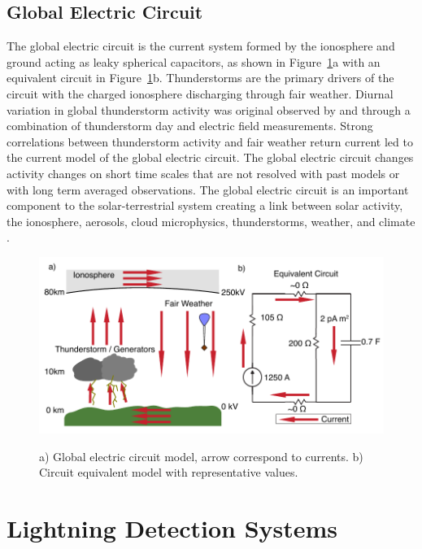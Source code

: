 \subsection{Global Electric Circuit}

The global electric circuit is the current system formed by the ionosphere and ground acting as leaky spherical capacitors, as shown in Figure~\ref{intro:fig:gec}a with an equivalent circuit in Figure~\ref{intro:fig:gec}b.
Thunderstorms are the primary drivers of the circuit with the charged ionosphere discharging through fair weather.
Diurnal variation in global thunderstorm activity was original observed by \citet{Wilson1921} and \citet{Whipple1929} through a combination of thunderstorm day and electric field measurements.
Strong correlations between thunderstorm activity and fair weather return current led to the current model of the global electric circuit.
The global electric circuit changes activity changes on short time scales that are not resolved with past models or with long term averaged observations.
The global electric circuit is an important component to the solar-terrestrial system creating a link between solar activity, the ionosphere, aerosols, cloud microphysics, thunderstorms, weather, and climate \citep{Tinsley2007, Holzworth1986}.

\begin{figure}[ht!]
	\centering
	\includegraphics[scale=1]{Introduction/Figures/Global_Circuit.pdf}\\
	\caption{a) Global electric circuit model, arrow correspond to currents.
			b) Circuit equivalent model with representative values.}
	\label{intro:fig:gec}
\end{figure}

\section{Lightning Detection Systems}

